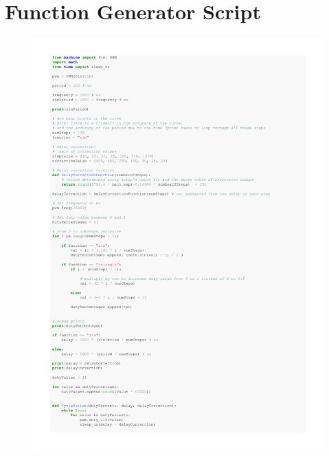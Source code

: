 \documentclass[%
 reprint,
 amsmath,amssymb,
 aps,
]{revtex4-2}
\begin{document}
\clearpage

\section{Function Generator Script}
    \begin{figure}[h]
        \includegraphics[width=\columnwidth,page=1]{Images/functionGenerator.pdf}
    \end{figure}
\end{document}

